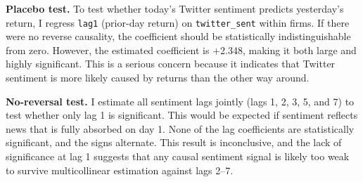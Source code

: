 \documentclass[12pt]{article}
\begin{document}
\textbf{Placebo test.} To test whether today's Twitter sentiment predicts yesterday's return, I regress \texttt{lag1} (prior-day return) on \texttt{twitter\_sent} within firms. If there were no reverse causality, the coefficient should be statistically indistinguishable from zero. However, the estimated coefficient is $+$2.348, making it both large and highly significant. This is a serious concern because it indicates that Twitter sentiment is more likely caused by returns than the other way around.

\textbf{No-reversal test.} I estimate all sentiment lags jointly (lags 1, 2, 3, 5, and 7) to test whether only lag 1 is significant. This would be expected if sentiment reflects news that is fully absorbed on day 1. None of the lag coefficients are statistically significant, and the signs alternate. This result is inconclusive, and the lack of significance at lag 1 suggests that any causal sentiment signal is likely too weak to survive multicollinear estimation against lags 2--7.
\end{document}
